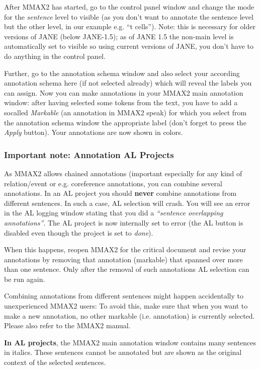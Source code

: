 \documentclass[DIV12,english,11pt,halfparskip]{scrartcl}
\begin{document}
After MMAX2 has started, go to the control panel window and change the
mode for the \emph{sentence} level to visible (as you don't want to
annotate the sentence level but the other level, in our example e.g.
``t cells''). Note: this is necessary for older versions of JANE
(below JANE-1.5); as of JANE 1.5 the non-main level is automatically
set to visible so using current versions of JANE, you don't have to do
anything in the control panel.

Further, go to the annotation schema window and also
select your according annotation schema here (if not selected already)
which will reveal the labels you can assign. Now you can make
annotations in your MMAX2 main annotation window: after having selected
some tokens from the text, you have to add a socalled \emph{Markable}
(an annotation in MMAX2 speak) for which you select from the annotation
schema window the appropriate label (don't forget to press the
\emph{Apply} button). Your annotations are now shown in colors.

\subsubsection{Important note: Annotation AL Projects} 

As MMAX2 allows chained annotations (important especially for any kind
of relation/event or e.g. coreference annotations, you can combine
several annotations. In an AL project you should \textbf{never}
combine annotations from different sentences. In such a case, AL
selection will crash. You will see an error in the AL logging window
stating that you did a \emph{``sentence overlapping
  annotations''}. The AL project is now internally set to error (the
AL button is disabled even though the project is set to \emph{done}).

When this happens, reopen MMAX2 for the critical document and revise
your annotations by removing that annotation (markable) that spanned
over more than one sentence.  Only after the removal of such
annotations AL selection can be run again.

Combining annotations from different sentences might happen
accidentally to unexperienced MMAX2 users: To avoid this, make sure
that when you want to make a new annotation, no other markable (i.e.
annotation) is currently selected. Please also refer to the MMAX2
manual.



\textbf{In AL projects}, the MMAX2 main annotation window contains many
sentences in italics. These sentences cannot be annotated but are
shown as the original context of the selected sentences.





\end{document}
